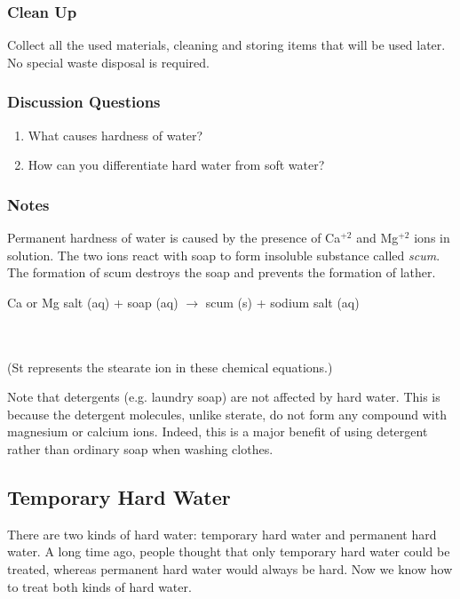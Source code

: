 \subsubsection*{Clean Up}
Collect all the used materials, cleaning and storing items that will be used later. No special waste disposal is required.

\subsubsection*{Discussion Questions}
\begin{enumerate}
\item{What causes hardness of water?}
\item{How can you differentiate hard water from soft water?}
\end{enumerate}

\subsubsection*{Notes}
Permanent hardness of water is caused by the presence of Ca$^{+2}$ and Mg$^{+2}$ ions in solution. The two ions react with soap to form insoluble substance called \textit{scum}. The formation of scum destroys the soap and prevents the formation of lather. 
\begin{center}
Ca or Mg salt (aq) + soap (aq)  $\longrightarrow$ scum (s) + sodium salt (aq)\\
\\
\\
\end{center}
(St represents the stearate ion  in these chemical equations.)

Note that detergents (e.g. laundry soap) are not affected by hard water. This is because the detergent molecules, unlike sterate, do not form any compound with magnesium or calcium ions. Indeed, this is a major benefit of using detergent rather than ordinary soap when washing clothes.

\subsection{Temporary Hard Water}

There are two kinds of hard water: temporary hard water and permanent hard water. A long time ago, people thought that only temporary hard water could be treated, whereas permanent hard water would always be hard. Now we know how to treat both kinds of hard water.

